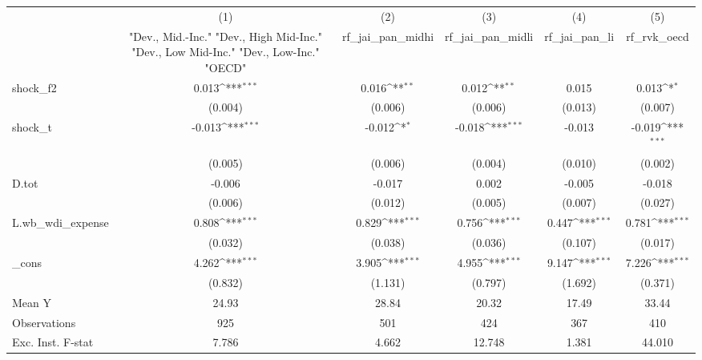 {
\def\sym#1{\ifmmode^{#1}\else\(^{#1}\)\fi}
\begin{tabular}{l*{5}{c}}
\toprule
            &\multicolumn{1}{c}{(1)}&\multicolumn{1}{c}{(2)}&\multicolumn{1}{c}{(3)}&\multicolumn{1}{c}{(4)}&\multicolumn{1}{c}{(5)}\\
            &\multicolumn{1}{c}{ "Dev., Mid.-Inc." "Dev., High Mid-Inc." "Dev., Low Mid-Inc." "Dev., Low-Inc." "OECD" }&\multicolumn{1}{c}{rf\_jai\_pan\_midhi}&\multicolumn{1}{c}{rf\_jai\_pan\_midli}&\multicolumn{1}{c}{rf\_jai\_pan\_li}&\multicolumn{1}{c}{rf\_rvk\_oecd}\\
\midrule
shock\_f2    &       0.013\sym{***}&       0.016\sym{**} &       0.012\sym{**} &       0.015         &       0.013\sym{*}  \\
            &     (0.004)         &     (0.006)         &     (0.006)         &     (0.013)         &     (0.007)         \\
\addlinespace
shock\_t     &      -0.013\sym{***}&      -0.012\sym{*}  &      -0.018\sym{***}&      -0.013         &      -0.019\sym{***}\\
            &     (0.005)         &     (0.006)         &     (0.004)         &     (0.010)         &     (0.002)         \\
\addlinespace
D.tot       &      -0.006         &      -0.017         &       0.002         &      -0.005         &      -0.018         \\
            &     (0.006)         &     (0.012)         &     (0.005)         &     (0.007)         &     (0.027)         \\
\addlinespace
L.wb\_wdi\_expense&       0.808\sym{***}&       0.829\sym{***}&       0.756\sym{***}&       0.447\sym{***}&       0.781\sym{***}\\
            &     (0.032)         &     (0.038)         &     (0.036)         &     (0.107)         &     (0.017)         \\
\addlinespace
\_cons      &       4.262\sym{***}&       3.905\sym{***}&       4.955\sym{***}&       9.147\sym{***}&       7.226\sym{***}\\
            &     (0.832)         &     (1.131)         &     (0.797)         &     (1.692)         &     (0.371)         \\
\midrule
Mean Y      &       24.93         &       28.84         &       20.32         &       17.49         &       33.44         \\
Observations&         925         &         501         &         424         &         367         &         410         \\
Exc. Inst. F-stat&       7.786         &       4.662         &      12.748         &       1.381         &      44.010         \\
\bottomrule
\end{tabular}
}

